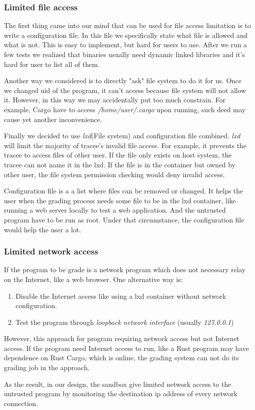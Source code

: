 \documentclass[conference,compsoc]{IEEEtran}
\begin{document}
		\subsubsection{Limited file access}
			\par
				The first thing came into our mind that can be used for file access limitation is to write a configuration file.
				In this file we specifically state what file is allowed and what is not.
				This is easy to implement, but hard for users to use. 
				After we run a few tests we realized that binaries usually need dynamic linked libraries and it's hard for user to list all of them.
			\par 
				Another way we considered is to directly "ask" file system to do it for us.
				Once we changed uid of the program, it can't access because file system will not allow it.
				However, in this way we may accidentally put too much constrain.
				For example, Cargo have to access \emph{ /home/user/.cargo } upon running, such deed may cause yet another inconvenience.
			\par 	
				Finally we decided to use \emph{lxd}(File system) and configuration file combined.
				\emph{lxd} will limit the majority of tracee's invalid file access. For example, it prevents the tracee to access files of other user. If the file only exists on host system, the tracee can not name it in the lxd. If the file is in the container but owned by other user, the file system permission checking would deny invalid access.
				\par
				Configuration file is a a list where files can be removed or changed. It helps the user when the grading process needs some file to be in the lxd container, like running a web server locally to test a web application. And the untrusted program have to be run as root. Under that circumstance, the configuration file would help the user a lot.
		\par
		\subsubsection{Limited network access}
	If the program to be grade is a network program which does not necessary relay on the Internet, like a web browser. One alternative way is:
	\par
	\begin{enumerate}
		\item{Disable the Internet access like using a lxd container without network configuration.}
		\item{Test the program through \emph{loopback network interface} (usually \emph{127.0.0.1})}
	\end{enumerate}
	\par
	However, this approach for program requiring network access but not Internet access. If the program need Internet access to run, like a Rust program may have dependence on Rust Cargo, which is online, the grading system can not do its grading job in the approach.
	\par
	As the result, in our design, the sandbox give limited network access to the untrusted program by monitoring the destination ip address of every network connection.
\end{document}
